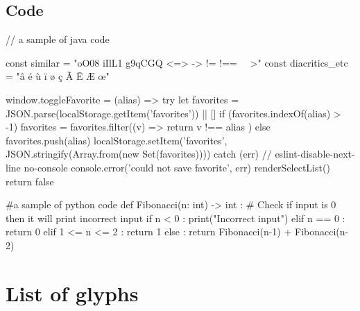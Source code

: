\documentclass[a4paper]{scrartcl}
\begin{document}
\subsection{Code}

\begin{codeblock}[minted language=java, title=Sample java code with ligatures,minted options app={formatcom=\fantasquesansmonocode}]
// a sample of java code

const similar = "oO08 iIlL1 g9qCGQ <=> -> != !== ~~>"
const diacritics_etc = "â é ù ï ø ç Ã Ē Æ œ"

window.toggleFavorite = (alias) => {
  try {
    let favorites = JSON.parse(localStorage.getItem('favorites')) || []
    if (favorites.indexOf(alias) > -1) {
      favorites = favorites.filter((v) => {
        return v !== alias
      })
    } else {
      favorites.push(alias)
    }
    localStorage.setItem('favorites', JSON.stringify(Array.from(new Set(favorites))))
  } catch (err) {
    // eslint-disable-next-line no-console
    console.error('could not save favorite', err)
  }
  renderSelectList()
  return false
}
\end{codeblock}

\begin{codeblock}[minted language=python3, title=Sample python code with ligatures,minted options app={formatcom=\fantasquesansmonocode}]
#a sample of python code
def Fibonacci(n: int) -> int :
  # Check if input is 0 then it will print incorrect input
  if n < 0 :
    print("Incorrect input")
  elif n == 0 :
    return 0
  elif 1 <= n <= 2 :
    return 1
  else :
    return Fibonacci(n-1) + Fibonacci(n-2)
\end{codeblock}

\pagebreak

\section{List of glyphs}

\end{document}
